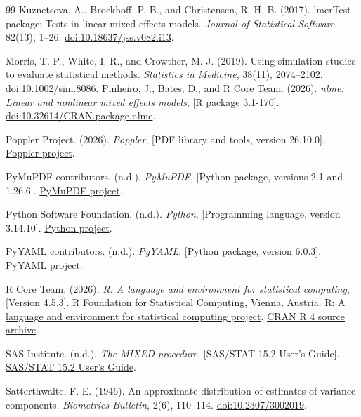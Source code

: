 \begin{thebibliography}{99}
Kuznetsova, A., Brockhoff, P. B., and Christensen, R. H. B. (2017). lmerTest package: Tests in linear mixed effects models.
\emph{Journal of Statistical Software}, 82(13), 1--26.
\href{https://doi.org/10.18637/jss.v082.i13}{doi:10.18637/jss.v082.i13}.

Morris, T. P., White, I. R., and Crowther, M. J. (2019).
Using simulation studies to evaluate statistical methods.
\emph{Statistics in Medicine}, 38(11), 2074--2102.
\href{https://doi.org/10.1002/sim.8086}{doi:10.1002/sim.8086}.
Pinheiro, J., Bates, D., and R Core Team. (2026).
\emph{nlme: Linear and nonlinear mixed effects models}, [R package 3.1-170].
\href{https://doi.org/10.32614/CRAN.package.nlme}{doi:10.32614/CRAN.package.nlme}.

Poppler Project. (2026).
\emph{Poppler}, [PDF library and tools, version 26.10.0].
\href{https://poppler.freedesktop.org/}{Poppler project}.

PyMuPDF contributors. (n.d.).
\emph{PyMuPDF}, [Python package, versions 2.1 and 1.26.6].
\href{https://github.com/pymupdf/PyMuPDF}{PyMuPDF project}.

Python Software Foundation. (n.d.).
\emph{Python}, [Programming language, version 3.14.10].
\href{https://www.python.org/}{Python project}.

PyYAML contributors. (n.d.).
\emph{PyYAML}, [Python package, version 6.0.3].
\href{https://pyyaml.org/}{PyYAML project}.

R Core Team. (2026).
\emph{R: A language and environment for statistical computing}, [Version 4.5.3]. R Foundation for Statistical Computing, Vienna, Austria.
\href{https://www.r-project.org/}{R: A language and environment for statistical computing project}. \href{https://cran.r-project.org/src/base/R-4/}{CRAN R 4 source archive}.

SAS Institute. (n.d.).
\emph{The MIXED procedure}, [SAS/STAT 15.2 User’s Guide].
\href{https://go.documentation.sas.com/api/docsets/statug/15.2/content/mixed.pdf}{SAS/STAT 15.2 User’s Guide}.

Satterthwaite, F. E. (1946). An approximate distribution of estimates of variance components.
\emph{Biometrics Bulletin}, 2(6), 110--114.
\href{https://doi.org/10.2307/3002019}{doi:10.2307/3002019}.


\end{thebibliography}
